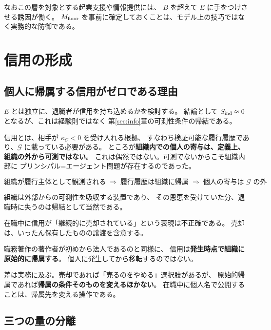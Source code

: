 なおこの層を対象とする起業支援や情報提供には、
$B$ を超えて $E$ に手をつけさせる誘因が働く。
$M_{\rm floor}$ を事前に確定しておくことは、モデル上の技巧ではなく実務的な防御である。

\section{信用の形成}
\label{sec:credit-formation}

\subsection{個人に帰属する信用がゼロである理由}

$E$ とは独立に、退職者が信用を持ち込めるかを検討する。
結論として $S_{\rm ind}\approx 0$ となるが、これは経験則ではなく
第\ref{sec:info}章の可測性条件の帰結である。

信用とは、相手が $\kappa_C<0$ を受け入れる根拠、
すなわち検証可能な履行履歴であり、$\mathcal{G}$ に載っている必要がある。
ところが\textbf{組織内での個人の寄与は、定義上、組織の外から可測ではない}。
これは偶然ではない。可測でないからこそ組織内部に
プリンシパル=エージェント問題が存在するのであった。

\begin{equation}
\text{組織が履行主体として観測される}
\;\Rightarrow\; \text{履行履歴は組織に帰属}
\;\Rightarrow\; \text{個人の寄与は $\mathcal{G}$ の外}
\end{equation}

組織は外部からの可測性を吸収する装置であり、
その恩恵を受けていた分、退職時に失うのは帰結として当然である。

\begin{remark}[売却ではなく原始的帰属]
在職中に信用が「継続的に売却されている」という表現は不正確である。
売却は、いったん保有したものの譲渡を含意する。

職務著作の著作者が初めから法人であるのと同様に、
信用は\textbf{発生時点で組織に原始的に帰属する}。
個人に発生してから移転するのではない。

差は実務に及ぶ。売却であれば「売るのをやめる」選択肢があるが、
原始的帰属であれば\textbf{帰属の条件そのものを変えるほかない}。
在職中に個人名で公開することは、帰属先を変える操作である。
\end{remark}

\subsection{三つの量の分離}

